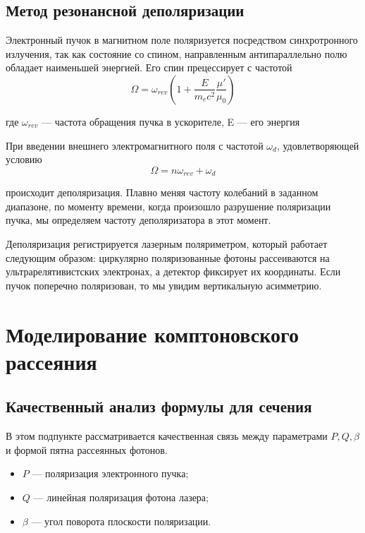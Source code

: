 \documentclass[12pt,a4paper]{article}
\begin{document}
\subsection*{Метод резонансной деполяризации} 
Электронный пучок в магнитном поле поляризуется посредством
синхротронного излучения, так как состояние со спином, направленным
антипараллельно полю обладает наименьшей энергией. Его спин прецессирует
с частотой
\begin{equation}
\Omega = \omega_{rev} \left(1 + \dfrac{E}{m_e c^2} \dfrac{\mu'}{\mu_0}\right)
\end{equation}

где $\omega_{rev}$ --- частота обращения пучка в ускорителе, E --- его энергия

При введении внешнего электромагнитного
поля с частотой $\omega_d$, удовлетворяющей условию
\begin{equation}
\Omega = n \omega_{rev} + \omega_d
\end{equation}

происходит деполяризация. Плавно меняя частоту колебаний в заданном
диапазоне, по моменту времени, когда произошло разрушение поляризации
пучка, мы определяем частоту деполяризатора в этот момент.

Деполяризация регистрируется лазерным поляриметром, который работает следующим образом: циркулярно поляризованные фотоны рассеиваются на ультрарелятивистских электронах, а детектор фиксирует их координаты. Если пучок поперечно поляризован, то мы увидим вертикальную
асимметрию.

\section{Моделирование комптоновского рассеяния}
\subsection{Качественный анализ формулы для сечения}
В этом подпункте рассматривается качественная связь между параметрами $P, Q, \beta$ и формой пятна рассеянных фотонов. 

\begin{itemize}
    \item $P$ --- поляризация электронного пучка;
    \item $Q$ --- линейная поляризация фотона лазера;
    \item $\beta$ --- угол поворота плоскости поляризации.
\end{itemize}
\end{document}
